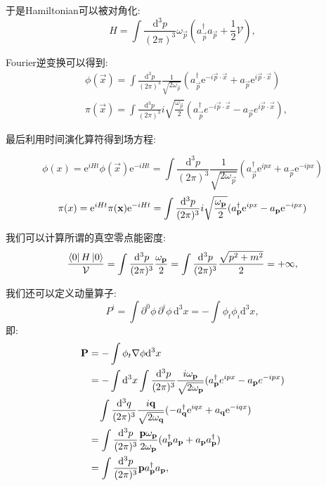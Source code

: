 于是Hamiltonian可以被对角化:
\begin{equation}
    H=\int\frac{\mathrm d^3p}{(2\pi)^3}\omega_{\vec p}(a^\dagger_{\vec p} a_{\vec p}+\frac12\mathcal V),
\end{equation}

Fourier逆变换可以得到:
\begin{align}
    &\phi(\vec x)=\int\frac{\mathrm d^3p}{(2\pi)^3}\frac1{\sqrt{2\omega_{\vec p}}}(a^\dagger_{\vec p}\mathrm e^{-i\vec p\cdot\vec x}+a_{\vec p}\mathrm e^{i\vec p\cdot\vec x})\\
    &\pi(\vec x)=\int\frac{\mathrm d^3p}{(2\pi)^3} i\sqrt{\frac{\omega_{\vec p}}{2}}(a^\dagger_{\vec p} e^{-i\vec p\cdot\vec x}-a_{\vec p} e^{i\vec p\cdot\vec x}),
\end{align}

最后利用时间演化算符得到场方程:
\begin{important}
    \begin{equation}\label{ch4freephi}
        \phi(x)=\mathrm e^{iHt}\phi(\vec x)\mathrm e^{-iHt}=\int\frac{\mathrm d^3p}{(2\pi)^3}\frac1{\sqrt{2\omega_{\vec p}}}(a_{\vec p}^\dagger\mathrm e^{ipx}+a_{\vec p}\mathrm e^{-ipx})
    \end{equation}
    \begin{equation}\label{ch4freepi}
        \pi(x)=\mathrm e^{iHt}\pi(\mathbf{x})\mathrm e^{-iHt}=\int\frac{\mathrm d^3p}{(2\pi)^3} i\sqrt{\frac{\omega_{\mathbf{p}}}{2}}(a^\dagger_{\mathbf{p}} \mathrm e^{ipx}-a_{\mathbf{p}} \mathrm e^{-ipx})
    \end{equation}
\end{important}

我们可以计算所谓的真空零点能密度:
\begin{equation}
    \frac{\bra0 H\ket0}{\mathcal V}=\int\frac{\mathrm d^3p}{(2\pi)^3}\frac{\omega_{\mathbf{p}}}{2}=\int\frac{\mathrm d^3p}{(2\pi)^3}\frac{\sqrt{p^2+m^2}}{2}=+\infty,
\end{equation}

我们还可以定义动量算子:
\begin{equation}
    P^i=\int\partial^0\phi\,\partial^i\phi\,\mathrm d^3x=-\int\phi_t\phi_i\mathrm d^3x,
\end{equation}
即:
\begin{align}
    \vec P&=-\int\phi_t\nabla\phi\mathrm d^3x\\
    &=-\int\mathrm d^3x\int\ldsq{p}[i\omega_{\vec p}](a^\dagger_{\vec p} e^{ipx}-a_{\vec p} e^{-ipx})\\
    &\quad\int\ldsq{q}[i\vec q](-a^\dagger_{\vec q}\exp{iqx}+a_{\vec q}\exp{-iqx})\\
    &=\int\ld{p}[\vec p\omega_{\vec p}](a^\dagger_{\vec p} a_{\vec p}+a_{\vec p}a^\dagger_{\vec p})\\
    &=\int\ddd p\vec p a^\dagger_{\vec p} a_{\vec p},
\end{align}

